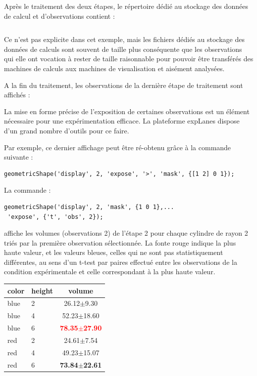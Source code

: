 Après le traitement des deux étapes, le répertoire dédié au stockage des données de calcul et d'observations contient :
\begin{tabular}{cc}

\end{tabular}

Ce n'est pas explicite dans cet exemple, mais les fichiers  dédiés au stockage des données de calculs sont souvent de taille plus conséquente que les observations qui elle ont vocation à rester de taille raisonnable pour pouvoir être transférés des machines de calculs aux machines de visualisation et aisément analysées.

A la fin du traitement, les observations de la dernière étape de traitement sont affichés :


La mise en forme précise de l'exposition de certaines observations est un élément nécessaire pour une expérimentation efficace. La plateforme expLanes dispose d'un grand nombre d'outils pour ce faire.

Par exemple, ce dernier affichage peut être ré-obtenu grâce à la commande suivante :
\begin{lstlisting}
geometricShape('display', 2, 'expose', '>', 'mask', {[1 2] 0 1});
\end{lstlisting}
La commande :
\begin{lstlisting}
geometricShape('display', 2, 'mask', {1 0 1},...
 'expose', {'t', 'obs', 2});
\end{lstlisting}
affiche les volumes (observations 2) de l'étape 2 pour chaque cylindre de rayon 2 triés par la première observation sélectionnée. La fonte rouge indique la plus haute valeur, et les valeurs bleues, celles qui ne sont pas statistiquement différentes, au sens d'un t-test par paires effectué entre les observations de la condition expérimentale et celle correspondant à la plus haute valeur.

\begin{margintable}
\caption{Visualisation sous forme de table \LaTeX.}
\begin{tabular}{llc}
color & height & volume \\
\hline
blue & 2 &  26.12$\pm$9.30 \\
blue & 4 & 52.23$\pm$18.60 \\
blue & 6 & \textbf{\textcolor{red}{78.35$\pm$27.90}} \\
red & 2 &  24.61$\pm$7.54 \\
red & 4 & 49.23$\pm$15.07 \\
red & 6 & \textbf{73.84$\pm$22.61} \\
\end{tabular}
\end{margintable}

